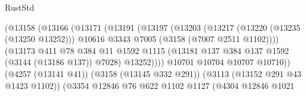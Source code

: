 \begin{lexlean}{RustStd}
\begin{coremodule}
{\begin{coremodule}
{{{{{{{{{{{{{{{{{{{{{{{{{{                                            (@13158
                                              (@13166
                                                (@13171
                                                  (@13191
                                                    (@13197
                                                      (@13203
                                                        (@13217
                                                          (@13220 (@13235 (@13250 @13252)))
                                                          @10616
                                                          @3343
                                                          @7005
                                                          (@3158 (@7007 @2511 @1102))))
                                                      (@13173
                                                        @411
                                                        @78
                                                        @384
                                                        @11
                                                        @1592
                                                        @1115
                                                        (@13181
                                                          @137
                                                          @384
                                                          @137
                                                          @1592
                                                          (@3144 (@13186 @137))
                                                          @7028)
                                                        @13252))))
                                                @10701
                                                @10704
                                                @10707
                                                @10710))
                                            (@4257 (@13141 @41))
                                            (@3158 (@13145 @332 @291))
                                            (@3113 (@13152 @291 @43 @1423 @1102))
                                            (@3354
                                              @12846
                                              @76
                                              @622
                                              @1102
                                              @1127
                                              (@4304
                                                @12846
                                                @1021
}}}}}}}}}}}}}}}}}}}}}}}}}}
\end{coremodule}}
\end{coremodule}
\end{lexlean}
